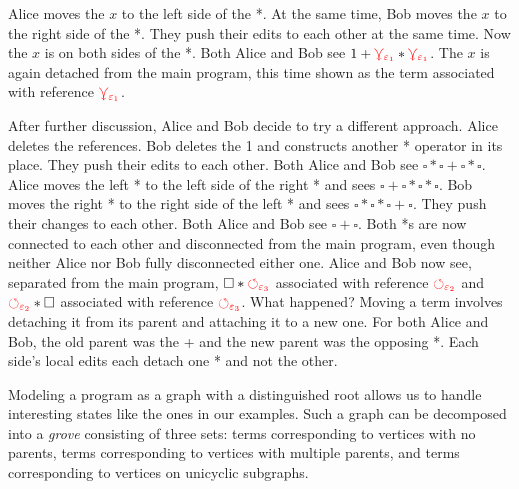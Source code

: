 \documentclass[nonacm, acmsmall, screen, review]{acmart}
\newcommand{\e}{\varepsilon}
\newcommand{\hole}{\ensuremath{\square}} %
\newcommand{\multiVertex}[1]{\textcolor{red}{\ensuremath{\curlyveedownarrow_{#1}}}}
\newcommand{\cycleVertex}[1]{\textcolor{red}{\ensuremath{\circlearrowleft_{#1}}}}
\begin{document}
Alice moves the $x$ to the left side of the *.
At the same time, Bob moves the $x$ to the right side of the *.
They push their edits to each other at the same time.
Now the $x$ is on both sides of the *.
Both Alice and Bob see $1 + \multiVertex{\e_1} * \multiVertex{\e_1}$.
The $x$ is again detached from the main program, this time shown as the term associated with reference $\multiVertex{\e_1}$.

After further discussion, Alice and Bob decide to try a different approach.
Alice deletes the references.
Bob deletes the 1 and constructs another * operator in its place.
They push their edits to each other.
Both Alice and Bob see $\hole * \hole + \hole * \hole$.
Alice moves the left * to the left side of the right * and sees $\hole + \hole * \hole * \hole$.
Bob moves the right * to the right side of the left * and sees $\hole * \hole * \hole + \hole$.
They push their changes to each other.
Both Alice and Bob see $\hole + \hole$.
Both *s are now connected to each other and disconnected from the main program, even though neither Alice nor Bob fully disconnected either one.
Alice and Bob now see, separated from the main program, $\hole * \cycleVertex{\e_3}$ associated with reference $\cycleVertex{\e_2}$ and $\cycleVertex{\e_2} * \hole$ associated with reference $\cycleVertex{\e_3}$.
What happened?
Moving a term involves detaching it from its parent and attaching it to a new one.
For both Alice and Bob, the old parent was the + and the new parent was the opposing *.
Each side's local edits each detach one * and not the other.







Modeling a program as a graph with a distinguished root allows us to handle interesting states like the ones in our examples.
Such a graph can be decomposed into a \emph{grove} consisting of three sets:
  terms corresponding to vertices with no parents,
  terms corresponding to vertices with multiple parents,
  and terms corresponding to vertices on unicyclic subgraphs.
\end{document}
